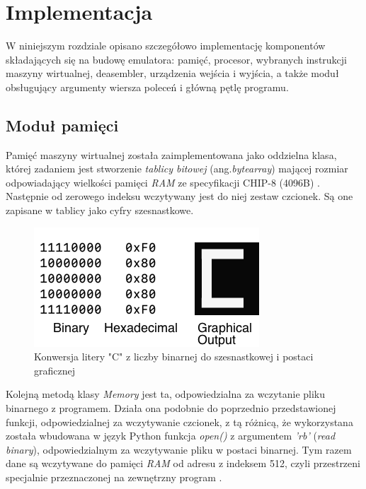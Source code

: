 \section{Implementacja}
W niniejszym rozdziale opisano szczegółowo implementację komponentów składających się na budowę emulatora: pamięć, procesor, wybranych instrukcji maszyny wirtualnej, deasembler, urządzenia wejścia i wyjścia, a także moduł obsługujący argumenty wiersza poleceń i główną pętlę programu.

\subsection{Moduł pamięci}
Pamięć maszyny wirtualnej została zaimplementowana jako oddzielna klasa, której zadaniem jest stworzenie \emph{tablicy bitowej} (ang.\emph{bytearray}) mającej rozmiar odpowiadający wielkości pamięci \textit{RAM} ze specyfikacji CHIP-8 (4096B) \cite{Cowgod}. Następnie od zerowego indeksu wczytywany jest do niej zestaw czcionek. Są one zapisane w tablicy jako cyfry szesnastkowe. 

\begin{figure}[!htb]
	\begin{center}
		\includegraphics[scale=0.6]{images/c8_fonts_repr}
		\caption{Konwersja litery "C" z liczby binarnej do szesnastkowej i postaci graficznej}
	\end{center}
\end{figure}

Kolejną metodą klasy \textit{Memory} jest ta, odpowiedzialna za wczytanie pliku binarnego z programem. Działa ona podobnie do poprzednio przedstawionej funkcji, odpowiedzialnej za wczytywanie czcionek, z tą różnicą, że wykorzystana została wbudowana w język Python funkcja \textit{open()} z argumentem  \textit{'rb'} (\textit{read binary}), odpowiedzialnym za wczytywanie pliku w postaci binarnej. Tym razem dane są wczytywane do pamięci \textit{RAM} od adresu z indeksem 512, czyli przestrzeni specjalnie przeznaczonej na zewnętrzny program \cite{Cowgod}.

